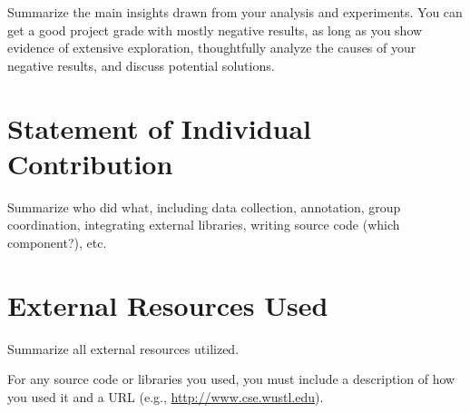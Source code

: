 \documentclass[10pt,twocolumn,letterpaper]{article}
\begin{document}
Summarize the main insights drawn from your analysis and experiments. You can get a good project grade with mostly negative results, as long as you show evidence of extensive exploration, thoughtfully analyze the causes of your negative results, and discuss potential solutions.


\section{Statement of Individual Contribution}

Summarize who did what, including data collection, annotation, group coordination, integrating external libraries, writing source code (which component?), etc.

\section{External Resources Used}

Summarize all external resources utilized.

For any source code or libraries you used, you must include a description of how you used it and a URL (e.g., \url{http://www.cse.wustl.edu}).

  {\small
    
    
  }
\end{document}
